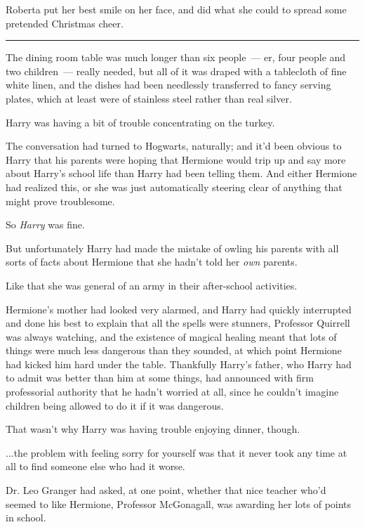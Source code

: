 Roberta put her best smile on her face, and did what she could to spread some pretended Christmas cheer.

\begin{center}\rule{3in}{0.4pt}\end{center}

The dining room table was much longer than six people~--- er, four people and two children~--- really needed, but all of it was draped with a tablecloth of fine white linen, and the dishes had been needlessly transferred to fancy serving plates, which at least were of stainless steel rather than real silver.

Harry was having a bit of trouble concentrating on the turkey.

The conversation had turned to Hogwarts, naturally; and it'd been obvious to Harry that his parents were hoping that Hermione would trip up and say more about Harry's school life than Harry had been telling them. And either Hermione had realized this, or she was just automatically steering clear of anything that might prove troublesome.

So \emph{Harry} was fine.

But unfortunately Harry had made the mistake of owling his parents with all sorts of facts about Hermione that she hadn't told her \emph{own} parents.

Like that she was general of an army in their after-school activities.

Hermione's mother had looked very alarmed, and Harry had quickly interrupted and done his best to explain that all the spells were stunners, Professor Quirrell was always watching, and the existence of magical healing meant that lots of things were much less dangerous than they sounded, at which point Hermione had kicked him hard under the table. Thankfully Harry's father, who Harry had to admit was better than him at some things, had announced with firm professorial authority that he hadn't worried at all, since he couldn't imagine children being allowed to do it if it was dangerous.

That wasn't why Harry was having trouble enjoying dinner, though.

...the problem with feeling sorry for yourself was that it never took any time at all to find someone else who had it worse.

Dr. Leo Granger had asked, at one point, whether that nice teacher who'd seemed to like Hermione, Professor McGonagall, was awarding her lots of points in school.

